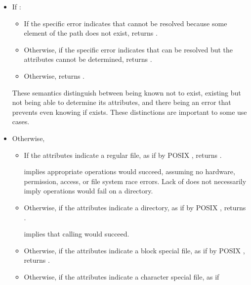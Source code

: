 \begin{itemdescr}
\pnum
\returns
\begin{itemize}
\item
If :
\begin{itemize}
\item If the specific error indicates that  cannot be resolved
      because some element of the path does not exist, returns
      .
\item Otherwise, if the specific error indicates that  can be resolved
      but the attributes cannot be determined, returns
      .
\item Otherwise, returns .
\end{itemize}
\begin{note} These semantics distinguish between  being known not to exist,  existing but not being able to determine its attributes,
        and there being an error that prevents even knowing if  exists. These
        distinctions are important to some use cases. \end{note}
\item
Otherwise,
\begin{itemize}
\item If the attributes indicate a regular file, as if by POSIX ,
      returns . \begin{note}
       implies appropriate  operations
      would succeed, assuming no hardware, permission, access, or file system
      race errors. Lack of  does not necessarily imply
       operations would fail on a directory.  \end{note}
\item Otherwise, if the attributes indicate a directory, as if by POSIX
      , returns .
      \begin{note}  implies that calling
       would succeed.  \end{note}
\item Otherwise, if the attributes indicate a block special file, as if by
      POSIX , returns .
\item Otherwise, if the attributes indicate a character special file, as if

\end{itemize}
\end{itemize}
\end{itemdescr}
